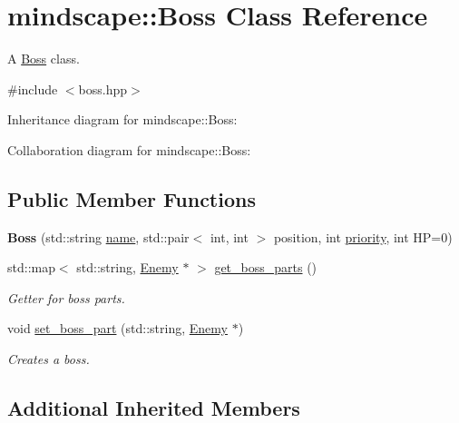 \hypertarget{classmindscape_1_1_boss}{}\section{mindscape\+:\+:Boss Class Reference}
\label{classmindscape_1_1_boss}


A \hyperlink{classmindscape_1_1_boss}{Boss} class.  




{\ttfamily \#include $<$boss.\+hpp$>$}



Inheritance diagram for mindscape\+:\+:Boss\+:


Collaboration diagram for mindscape\+:\+:Boss\+:
\subsection*{Public Member Functions}
\begin{DoxyCompactItemize}
\item 
{\bfseries Boss} (std\+::string \hyperlink{classengine_1_1_game_object_a1f104f7af4f351e6d3278319762c9fe5}{name}, std\+::pair$<$ int, int $>$ position, int \hyperlink{classengine_1_1_game_object_a159ecaca30229e302793b11a75bd13c2}{priority}, int HP=0)\hypertarget{classmindscape_1_1_boss_af33cbd15d9179b25695dd1c9165bf4c3}{}\label{classmindscape_1_1_boss_af33cbd15d9179b25695dd1c9165bf4c3}

\item 
std\+::map$<$ std\+::string, \hyperlink{classmindscape_1_1_enemy}{Enemy} $\ast$ $>$ \hyperlink{classmindscape_1_1_boss_a8d557eed8f62a95182140d7f6170ed9e}{get\+\_\+boss\+\_\+parts} ()
\begin{DoxyCompactList}\small\item\em Getter for boss\textquotesingle{} parts. \end{DoxyCompactList}\item 
void \hyperlink{classmindscape_1_1_boss_a1f4a5e7e3d9ab6a39c607a317440aabe}{set\+\_\+boss\+\_\+part} (std\+::string, \hyperlink{classmindscape_1_1_enemy}{Enemy} $\ast$)
\begin{DoxyCompactList}\small\item\em Creates a boss. \end{DoxyCompactList}\end{DoxyCompactItemize}
\subsection*{Additional Inherited Members}



